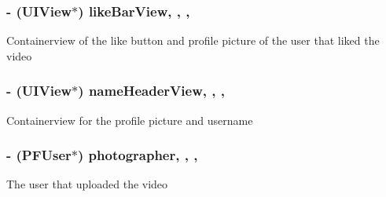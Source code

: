 \subsubsection[{like\+Bar\+View}]{\setlength{\rightskip}{0pt plus 5cm}-\/ (U\+I\+View$\ast$) like\+Bar\+View\hspace{0.3cm}{\ttfamily [read]}, {\ttfamily [write]}, {\ttfamily [nonatomic]}, {\ttfamily [strong]}}\label{category_e_s_video_details_header_view_07_08_af42ed1bacbcf9235870450b6af3ccc72}
Containerview of the like button and profile picture of the user that liked the video \hypertarget{category_e_s_video_details_header_view_07_08_a2a1ed754b0a99d09e79a390fe50226e2}{}
\subsubsection[{name\+Header\+View}]{\setlength{\rightskip}{0pt plus 5cm}-\/ (U\+I\+View$\ast$) name\+Header\+View\hspace{0.3cm}{\ttfamily [read]}, {\ttfamily [write]}, {\ttfamily [nonatomic]}, {\ttfamily [strong]}}\label{category_e_s_video_details_header_view_07_08_a2a1ed754b0a99d09e79a390fe50226e2}
Containerview for the profile picture and username \hypertarget{category_e_s_video_details_header_view_07_08_a0701698bf7def5f0d5d89bdebe7e4856}{}
\subsubsection[{photographer}]{\setlength{\rightskip}{0pt plus 5cm}-\/ (P\+F\+User$\ast$) photographer\hspace{0.3cm}{\ttfamily [read]}, {\ttfamily [write]}, {\ttfamily [nonatomic]}, {\ttfamily [strong]}}\label{category_e_s_video_details_header_view_07_08_a0701698bf7def5f0d5d89bdebe7e4856}
The user that uploaded the video \hypertarget{category_e_s_video_details_header_view_07_08_a4486f657dd26c68c6dd89e2a3bea9a34}{}
